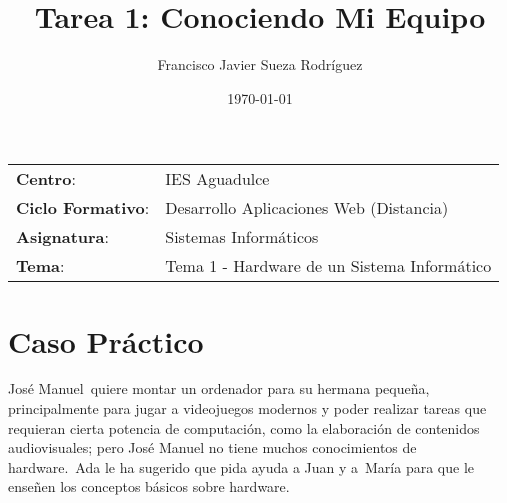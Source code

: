 


\title{
\vspace{10ex}
\normalfont \normalsize
\Huge \textbf{Tarea 1: Conociendo Mi Equipo}
}
\author{Francisco Javier Sueza Rodríguez}
\date{\normalsize\today}



\maketitle

\thispagestyle{empty}

\vspace{75ex}

\begin{center}
    \begin{tabular}{l l}
        \textbf{Centro}: & IES Aguadulce \\
        \textbf{Ciclo Formativo}: & Desarrollo Aplicaciones Web (Distancia)\\
        \textbf{Asignatura}: & Sistemas Informáticos\\
        \textbf{Tema}: & Tema 1 -  Hardware de un Sistema Informático\\
    \end{tabular}
\end{center}

\newpage





\section{Caso Práctico}
José Manuel quiere montar un ordenador para su hermana pequeña, principalmente para jugar a videojuegos modernos y poder realizar tareas que requieran cierta potencia de computación, como la elaboración de contenidos audiovisuales; pero José Manuel no tiene muchos conocimientos de hardware. Ada le ha sugerido que pida ayuda a Juan y a María para que le enseñen los conceptos básicos sobre hardware.

